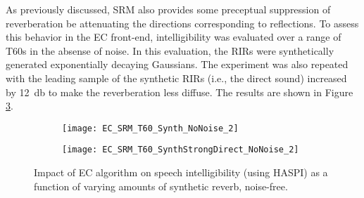 As previously discussed, SRM also provides some preceptual suppression of reverberation be attenuating the directions corresponding to reflections. To assess this behavior in the EC front-end, intelligibility was evaluated over a range of T60s in the absense of noise. In this evaluation, the RIRs were synthetically generated exponentially decaying Gaussians. The experiment was also repeated with the leading sample of the synthetic RIRs (i.e., the direct sound) increased by \qty{12}{\decibel} to make the reverberation less diffuse. The results are shown in Figure \ref{fig:EC_SRM_T60_Synth2}.


\begin{figure}[H]
	\centering
	\begin{subfigure}[b]{0.49\textwidth}
		\centering
		\texttt{[image: EC\_SRM\_T60\_Synth\_NoNoise\_2]}
		\label{subfig:EC_SRM_T60_Synth_NoNoise2}
	\end{subfigure}
	\hfill
	\begin{subfigure}[b]{0.49\textwidth}
		\centering
		\texttt{[image: EC\_SRM\_T60\_SynthStrongDirect\_NoNoise\_2]}
		\label{subfig:EC_SRM_T60_SynthStrongDirect_NoNoise2}
	\end{subfigure}
	\caption[EC spatial release from reverberation masking performance]{Impact of EC algorithm on speech intelligibility (using HASPI) as a function of varying amounts of synthetic reverb, noise-free.}
	\label{fig:EC_SRM_T60_Synth2}
\end{figure}

